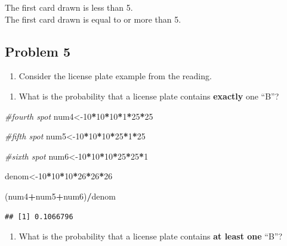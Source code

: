 \documentclass[
]{book}
\newenvironment{Shaded}{\begin{snugshade}}{\end{snugshade}}
\newcommand{\CommentTok}[1]{\textcolor[rgb]{0.56,0.35,0.01}{\textit{#1}}}
\newcommand{\DecValTok}[1]{\textcolor[rgb]{0.00,0.00,0.81}{#1}}
\newcommand{\NormalTok}[1]{#1}
\newcommand{\OperatorTok}[1]{\textcolor[rgb]{0.81,0.36,0.00}{\textbf{#1}}}
\providecommand{\tightlist}{%
  \setlength{\itemsep}{0pt}\setlength{\parskip}{0pt}}
\begin{document}
The first card drawn is less than 5.\\
The first card drawn is equal to or more than 5.

\hypertarget{problem-5-1}{%
\subsection{Problem 5}\label{problem-5-1}}

\begin{enumerate}
\def\labelenumi{\arabic{enumi}.}
\setcounter{enumi}{4}
\tightlist
\item
  Consider the license plate example from the reading.
\end{enumerate}

\begin{enumerate}
\def\labelenumi{\alph{enumi}.}
\tightlist
\item
  What is the probability that a license plate contains \textbf{exactly} one ``B''?
\end{enumerate}

\begin{Shaded}
\begin{Highlighting}[]
\CommentTok{#fourth spot}
\NormalTok{num4<-}\DecValTok{10}\OperatorTok{*}\DecValTok{10}\OperatorTok{*}\DecValTok{10}\OperatorTok{*}\DecValTok{1}\OperatorTok{*}\DecValTok{25}\OperatorTok{*}\DecValTok{25}

\CommentTok{#fifth spot}
\NormalTok{num5<-}\DecValTok{10}\OperatorTok{*}\DecValTok{10}\OperatorTok{*}\DecValTok{10}\OperatorTok{*}\DecValTok{25}\OperatorTok{*}\DecValTok{1}\OperatorTok{*}\DecValTok{25}

\CommentTok{#sixth spot}
\NormalTok{num6<-}\DecValTok{10}\OperatorTok{*}\DecValTok{10}\OperatorTok{*}\DecValTok{10}\OperatorTok{*}\DecValTok{25}\OperatorTok{*}\DecValTok{25}\OperatorTok{*}\DecValTok{1}

\NormalTok{denom<-}\DecValTok{10}\OperatorTok{*}\DecValTok{10}\OperatorTok{*}\DecValTok{10}\OperatorTok{*}\DecValTok{26}\OperatorTok{*}\DecValTok{26}\OperatorTok{*}\DecValTok{26}

\NormalTok{(num4}\OperatorTok{+}\NormalTok{num5}\OperatorTok{+}\NormalTok{num6)}\OperatorTok{/}\NormalTok{denom}
\end{Highlighting}
\end{Shaded}

\begin{verbatim}
## [1] 0.1066796
\end{verbatim}

\begin{enumerate}
\def\labelenumi{\alph{enumi}.}
\setcounter{enumi}{1}
\tightlist
\item
  What is the probability that a license plate contains \textbf{at least one} ``B''?
\end{enumerate}
\end{document}
